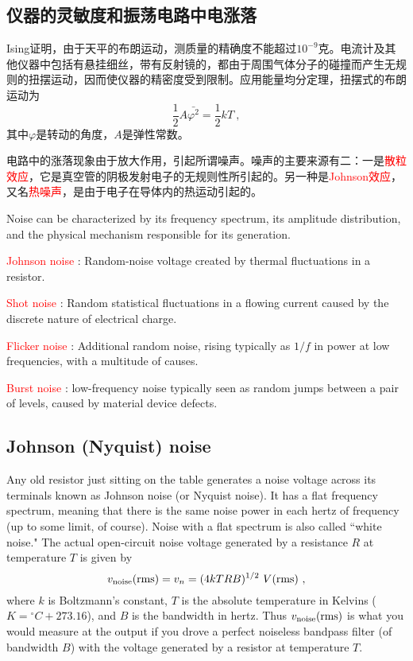 \documentclass[11pt,a4paper]{article}
\begin{document}
\subsection{仪器的灵敏度和振荡电路中电涨落}
\cite{wangzhuxi1965} Ising证明，由于天平的布朗运动，测质量的精确度不能超过$10^{-9}$克。电流计及其他仪器中包括有悬挂细丝，带有反射镜的，都由于周围气体分子的碰撞而产生无规则的扭摆运动，因而使仪器的精密度受到限制。应用能量均分定理，扭摆式的布朗运动为
\begin{equation}
\dfrac{1}{2} A \bar{\varphi^2} = \dfrac{1}{2} kT ~,
\end{equation}
其中$\varphi$是转动的角度，$A$是弹性常数。

电路中的涨落现象由于放大作用，引起所谓噪声。噪声的主要来源有二：一是\textcolor{red}{散粒效应}，它是真空管的阴极发射电子的无规则性所引起的。另一种是\textcolor{red}{Johnson效应}，又名\textcolor{red}{热噪声}，是由于电子在导体内的热运动引起的。

\cite{2015arel.book.....H} Noise can be characterized by its frequency spectrum, its amplitude distribution, and the physical mechanism responsible for its generation. 

\textcolor{red}{Johnson noise} : Random-noise voltage created by thermal fluctuations in a resistor.

\textcolor{red}{Shot noise} : Random statistical fluctuations in a flowing current caused by the discrete nature of electrical charge.

\textcolor{red}{Flicker noise} : Additional random noise, rising typically as $1/f$ in power at low frequencies, with a multitude of causes.

\textcolor{red}{Burst noise} : low-frequency noise typically seen as random jumps between a pair of levels, caused by material device defects.

\subsection{Johnson (Nyquist) noise}
Any old resistor just sitting on the table generates a noise voltage across its terminals known as Johnson noise (or Nyquist noise). It has a flat frequency spectrum, meaning that there is the same noise power in each hertz of frequency (up to some limit, of course). Noise with a flat spectrum is also called ``white noise." The actual open-circuit noise voltage generated by a resistance $R$ at temperature $T$ is given by
\begin{equation}
v_{\rm noise} ({\rm rms}) = v_n = (4 k T R B)^{1/2} ~ V({\rm rms}) ~,
\end{equation}
where $k$ is Boltzmann's constant, $T$ is the absolute temperature in Kelvins ($K=  {}^{\circ}C + 273.16$), and $B$ is the bandwidth in hertz. Thus $v_{\rm noise}({\rm rms})$ is what you would measure at the output if you drove a perfect noiseless bandpass filter (of bandwidth $B$) with the voltage generated by a resistor at temperature $T$. 
\end{document}
